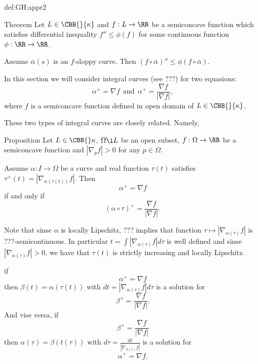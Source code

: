 {\begin{subthm}{def:GH:appr2}
\begin{thm}{Theorem}\label{thm:concave}
Let $L\in\CBB{}{\kappa}$ and $f:L\to \RR$ be a
semiconcave function which satisfies differential inequality $f''\le \phi(f)$ for some continuous function $\phi:\RR\to\RR$.

Assume $\bar\alpha(s)$ is an $f$-sloppy curve. 
Then $(f\circ\bar\alpha)''\le\phi(f\circ\bar\alpha)$.
\end{thm}




























In this section we will consider integral curves (see ???) for two equasions:
$$\alpha^+=\nabla f\ \ \text{and}\ \ \alpha^+= \frac{\nabla f}{|\nabla f|},$$
where $f$ is a semiconcave function defined in open domain of $L\in\CBB{}{\kappa}$.

These two types of integral curves are closely related.
Namely, 

\begin{thm}{Proposition}
Let $L\in\CBB{}\kappa$,
$\Omega\i L$ be an open subset,
$f:\Omega\to\RR$ be a semiconcave function 
and $|\nabla_p f|>0$ for any $p\in\Omega$.

Assume $\alpha:I\to\Omega$ be a curve and real function $\tau(t)$ satisfies $\tau^+(t)=|\nabla_{\alpha(\tau(t))} f|$.
Then
$$\alpha^+=\nabla f$$
if and only if 
$$(\alpha\circ\tau)^+= \frac{\nabla f}{|\nabla f|}.$$

\end{thm}

Note that sinse $\alpha$ is locally Lipschitz, ??? implies that function $\tau\mapsto |\nabla_{\alpha(\tau)} f|$ is ???-semicontinuous.
In particular $t=\int|\nabla_{\alpha(\tau)} f|d\tau$ is well defined and sinse $|\nabla_{\alpha(\tau)} f|>0$, we have that $\tau(t)$ is strictly increasing and locally Lipschitz.



\qeds

if
$$\alpha^+=\nabla f$$
then $\beta(t)=\alpha(\tau(t))$ with $dt=|\nabla_{\alpha(\tau)} f|d\tau$ is a solution for
$$\beta^+=\frac{\nabla f}{|\nabla f|}.$$
And vise versa, if 
$$\beta^+=\frac{\nabla f}{|\nabla f|}$$
then $\alpha(\tau)=\beta(t(\tau))$ with $d\tau=\frac{dt}{|\nabla_{\beta(t)} f|}$  is a solution for
$$\alpha^+=\nabla f.$$


\end{subthm}}
